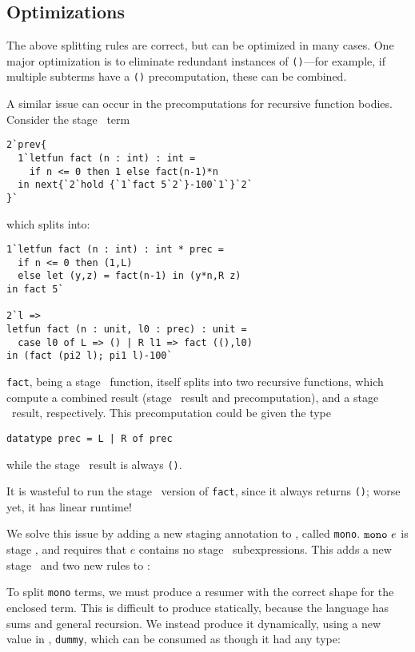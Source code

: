 

\subsection{Optimizations}

The above splitting rules are correct, but can be optimized in many cases. One
major optimization is to eliminate redundant instances of \texttt{()}---for
example, if multiple subterms have a \texttt{()} precomputation, these can be
combined.

A similar issue can occur in the precomputations for recursive function bodies.
Consider the stage \bbtwo\ term
\begin{lstlisting}
2`prev{
  1`letfun fact (n : int) : int = 
    if n <= 0 then 1 else fact(n-1)*n
  in next{`2`hold {`1`fact 5`2`}-100`1`}`2`
}`
\end{lstlisting}
which splits into:
\begin{lstlisting}
1`letfun fact (n : int) : int * prec = 
  if n <= 0 then (1,L) 
  else let (y,z) = fact(n-1) in (y*n,R z)
in fact 5`

2`l => 
letfun fact (n : unit, l0 : prec) : unit = 
  case l0 of L => () | R l1 => fact ((),l0)
in (fact (pi2 l); pi1 l)-100`
\end{lstlisting}
\texttt{fact}, being a stage \bbone\ function, itself splits into two recursive
functions, which compute a combined result (stage \bbone\ result and
precomputation), and a stage \bbtwo\ result, respectively. This precomputation
could be given the type
\begin{lstlisting}
datatype prec = L | R of prec
\end{lstlisting}
while the stage \bbtwo\ result is always \texttt{()}.

It is wasteful to run the stage \bbtwo\ version of \texttt{fact}, since it
always returns \texttt{()}; worse yet, it has linear runtime!

We solve this issue by adding a new staging annotation to \lang, called
\texttt{mono}. ${\tt mono}~e$ is stage \bbone, and requires that $e$ contains
no stage \bbtwo\ subexpressions. This adds a new stage \bbmono\ and two new
rules to \lang:


To split \texttt{mono} terms, we must produce a resumer with the correct shape
for the enclosed term. This is difficult to produce statically, because the
language has sums and general recursion. We instead produce it dynamically,
using a new value in \langmono, \texttt{dummy}, which can be consumed as though
it had any type:

